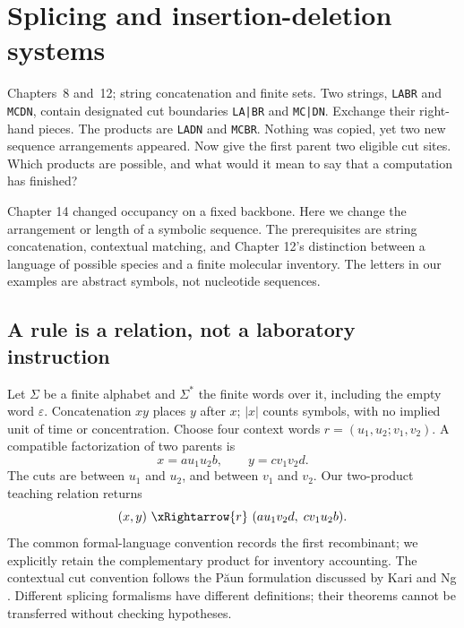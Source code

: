 \chapter{Splicing and insertion-deletion systems}
{Chapters~8 and~12; string concatenation and finite sets.}
Two strings, \texttt{LABR} and \texttt{MCDN}, contain designated cut boundaries
\texttt{LA|BR} and \texttt{MC|DN}. Exchange their right-hand pieces.
The products are \texttt{LADN} and \texttt{MCBR}. Nothing was copied, yet
two new sequence arrangements appeared. Now give the first parent two
eligible cut sites. Which products are possible, and what would it mean
to say that a computation has finished?

Chapter 14 changed occupancy on a fixed backbone. Here we change the
arrangement or length of a symbolic sequence. The prerequisites are string
concatenation, contextual matching, and Chapter 12's distinction between
a language of possible species and a finite molecular inventory.
The letters in our examples are abstract symbols, not nucleotide sequences.

\section{A rule is a relation, not a laboratory instruction}
Let $\Sigma$ be a finite alphabet and $\Sigma^*$ the finite words over it,
including the empty word $\varepsilon$. Concatenation $xy$ places $y$ after
$x$; $|x|$ counts symbols, with no implied unit of time or concentration.
Choose four context words $r=(u_1,u_2;v_1,v_2)$.
A compatible factorization of two parents is
\[
 x=a u_1u_2 b,\qquad y=c v_1v_2 d.
\]
The cuts are between $u_1$ and $u_2$, and between $v_1$ and $v_2$.
Our two-product teaching relation returns
\begin{equation}
 (x,y)\ \xRightarrow{r}\ (a u_1v_2d,\;c v_1u_2b).
 \label{eq:splice}
\end{equation}
The common formal-language convention records the first recombinant;
we explicitly retain the complementary product for inventory accounting.
The contextual cut convention follows the P\u{a}un formulation discussed
by Kari and Ng \cite{KariNg2019}. Different splicing formalisms have different
definitions; their theorems cannot be transferred without checking hypotheses.

